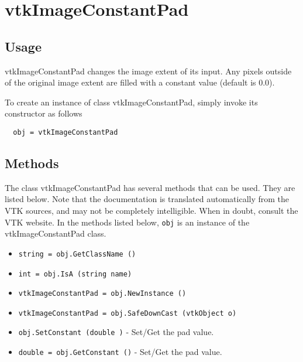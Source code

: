 \section{vtkImageConstantPad}

\subsection{Usage}

 vtkImageConstantPad changes the image extent of its input.
 Any pixels outside of the original image extent are filled with
 a constant value (default is 0.0).

To create an instance of class vtkImageConstantPad, simply
invoke its constructor as follows
\begin{verbatim}
  obj = vtkImageConstantPad
\end{verbatim}
\subsection{Methods}

The class vtkImageConstantPad has several methods that can be used.
  They are listed below.
Note that the documentation is translated automatically from the VTK sources,
and may not be completely intelligible.  When in doubt, consult the VTK website.
In the methods listed below, \verb|obj| is an instance of the vtkImageConstantPad class.
\begin{itemize}
\item  \verb|string = obj.GetClassName ()|

\item  \verb|int = obj.IsA (string name)|

\item  \verb|vtkImageConstantPad = obj.NewInstance ()|

\item  \verb|vtkImageConstantPad = obj.SafeDownCast (vtkObject o)|

\item  \verb|obj.SetConstant (double )| -  Set/Get the pad value.

\item  \verb|double = obj.GetConstant ()| -  Set/Get the pad value.

\end{itemize}
